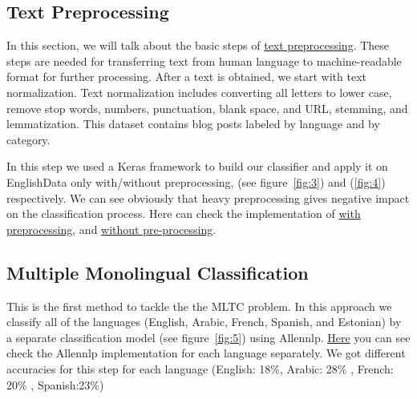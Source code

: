 \documentclass[letterpaper,12pt]{article}
\begin{document}
\subsection{Text Preprocessing}
In this section, we will talk about the basic steps of \href{https://github.com/nesmaAlmoazamy/Handling_Multilinguality/blob/master/EnglishData_classification_with_preprocessing.ipynb}{text preprocessing}. These steps are needed for transferring text from human language to machine-readable format for further processing. After a text is obtained, we start with text normalization. Text normalization includes converting all letters to lower case, remove stop words, numbers, punctuation, blank space, and URL, stemming, and lemmatization. This dataset contains blog posts labeled by language and by category.

In this step we used a Keras framework to build our classifier and apply it on EnglishData only with/without preprocessing, (see figure~\ref{fig:3}) and (\ref{fig:4}) respectively. We can see obviously that heavy preprocessing gives negative impact on the classification process. Here can check the implementation of 
\href{https://github.com/Mkamel104/MLTC/blob/master/EnglishData_classification_with_preprocessing.ipynb}{with preprocessing}, and \href{https://github.com/Mkamel104/MLTC/blob/master/EnglishData_Classification_without_preprocessing.ipynb}{without pre-processing}.



\subsection{Multiple Monolingual Classification}
This is the first method to tackle the the MLTC problem. In this approach we classify all of the languages (English, Arabic, French, Spanish, and Estonian) by a separate classification model (see figure~\ref{fig:5}) using Allennlp. 
\href{https://github.com/Mkamel104/MLTC/blob/master/AllenNlp/AllenNlp_PHASEI_PHASEII_PHASEIII.ipynb}{Here} you can see check the Allennlp implementation for each language separately. We got different accuracies for this step for each language (English: 18\%, Arabic: 28\% , French: 20\% , Spanish:23\%)
\end{document}
